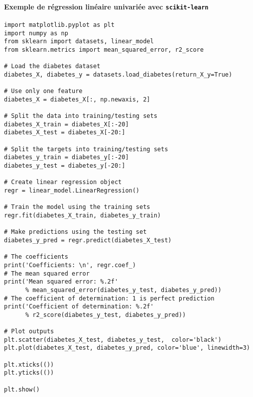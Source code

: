 \paragraph*{Exemple de régression linéaire univariée avec \texttt{scikit-learn}}
\begin{lstlisting}
import matplotlib.pyplot as plt
import numpy as np
from sklearn import datasets, linear_model
from sklearn.metrics import mean_squared_error, r2_score

# Load the diabetes dataset
diabetes_X, diabetes_y = datasets.load_diabetes(return_X_y=True)

# Use only one feature
diabetes_X = diabetes_X[:, np.newaxis, 2]

# Split the data into training/testing sets
diabetes_X_train = diabetes_X[:-20]
diabetes_X_test = diabetes_X[-20:]

# Split the targets into training/testing sets
diabetes_y_train = diabetes_y[:-20]
diabetes_y_test = diabetes_y[-20:]

# Create linear regression object
regr = linear_model.LinearRegression()

# Train the model using the training sets
regr.fit(diabetes_X_train, diabetes_y_train)

# Make predictions using the testing set
diabetes_y_pred = regr.predict(diabetes_X_test)

# The coefficients
print('Coefficients: \n', regr.coef_)
# The mean squared error
print('Mean squared error: %.2f'
      % mean_squared_error(diabetes_y_test, diabetes_y_pred))
# The coefficient of determination: 1 is perfect prediction
print('Coefficient of determination: %.2f'
      % r2_score(diabetes_y_test, diabetes_y_pred))

# Plot outputs
plt.scatter(diabetes_X_test, diabetes_y_test,  color='black')
plt.plot(diabetes_X_test, diabetes_y_pred, color='blue', linewidth=3)

plt.xticks(())
plt.yticks(())

plt.show()
\end{lstlisting}

